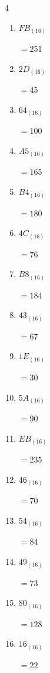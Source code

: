 \begin{multicols}{4}
\begin{enumerate}
        $=241$

  \item $FB_{(16)}$

        $=251$

\columnbreak %

  \item $2D_{(16)}$

        $=45$

  \item $64_{(16)}$

        $=100$

  \item $A5_{(16)}$

        $=165$

  \item $B4_{(16)}$

        $=180$

  \item $4C_{(16)}$

        $=76$

  \item $B8_{(16)}$

        $=184$

  \item $43_{(16)}$

        $=67$

  \item $1E_{(16)}$

        $=30$

  \item $5A_{(16)}$

        $=90$

  \item $EB_{(16)}$

        $=235$

  \item $46_{(16)}$

        $=70$

  \item $54_{(16)}$

        $=84$

  \item $49_{(16)}$

        $=73$

  \item $80_{(16)}$

        $=128$

  \item $16_{(16)}$

        $=22$


\end{enumerate}
\end{multicols}

